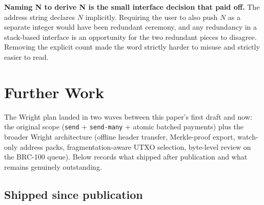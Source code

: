 \documentclass[a4paper, 11pt]{article}
\begin{document}
\textbf{Naming N to derive N is the small interface decision that paid off.} The address string declares $N$ implicitly. Requiring the user to also push $N$ as a separate integer would have been redundant ceremony, and any redundancy in a stack-based interface is an opportunity for the two redundant pieces to disagree. Removing the explicit count made the word strictly harder to misuse and strictly easier to read.

\section{Further Work}

The Wright plan landed in two waves between this paper's first draft and now: the original scope (\texttt{send} + \texttt{send-many} + atomic batched payments) plus the broader Wright architecture (offline header transfer, Merkle-proof export, watch-only address packs, fragmentation-aware UTXO selection, byte-level review on the BRC-100 queue). Below records what shipped after publication and what remains genuinely outstanding.

\subsection*{Shipped since publication}
\end{document}
